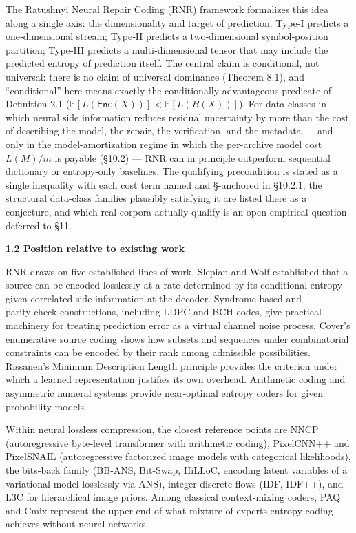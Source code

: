 \documentclass[
]{article}
\begin{document}
The Ratushnyi Neural Repair Coding (RNR) framework formalizes this idea
along a single axis: the dimensionality and target of prediction. Type‑I
predicts a one‑dimensional stream; Type‑II predicts a two‑dimensional
symbol‑position partition; Type‑III predicts a multi‑dimensional tensor
that may include the predicted entropy of prediction itself. The central
claim is conditional, not universal: there is no claim of universal
dominance (Theorem 8.1), and ``conditional'' here means exactly the
conditionally-advantageous predicate of Definition 2.1
($\mathbb{E}[L(\mathsf{Enc}(X))] < \mathbb{E}[L(B(X))]$). For data
classes in which neural side information reduces residual uncertainty
by more than the cost of describing the model, the repair, the
verification, and the metadata --- and only in the model-amortization
regime in which the per-archive model cost $L(M)/m$ is payable
(§10.2) --- RNR can in principle outperform sequential dictionary or
entropy‑only baselines. The qualifying precondition is stated as a
single inequality with each cost term named and §-anchored in §10.2.1;
the structural data-class families plausibly satisfying it are listed
there as a conjecture, and which real corpora actually qualify is an
open empirical question deferred to §11.

\textbf{1.2 Position relative to existing work}

RNR draws on five established lines of work. Slepian and Wolf
established that a source can be encoded losslessly at a rate determined
by its conditional entropy given correlated side information at the
decoder. Syndrome‑based and parity‑check constructions, including LDPC
and BCH codes, give practical machinery for treating prediction error as
a virtual channel noise process. Cover's enumerative source coding shows
how subsets and sequences under combinatorial constraints can be encoded
by their rank among admissible possibilities. Rissanen's Minimum
Description Length principle provides the criterion under which a
learned representation justifies its own overhead. Arithmetic coding and
asymmetric numeral systems provide near‑optimal entropy coders for given
probability models.

Within neural lossless compression, the closest reference points are
NNCP (autoregressive byte‑level transformer with arithmetic coding),
PixelCNN++ and PixelSNAIL (autoregressive factorized image models with
categorical likelihoods), the bits‑back family (BB‑ANS, Bit‑Swap,
HiLLoC, encoding latent variables of a variational model losslessly via
ANS), integer discrete flows (IDF, IDF++), and L3C for hierarchical
image priors. Among classical context‑mixing coders, PAQ and Cmix
represent the upper end of what mixture‑of‑experts entropy coding
achieves without neural networks.
\end{document}
